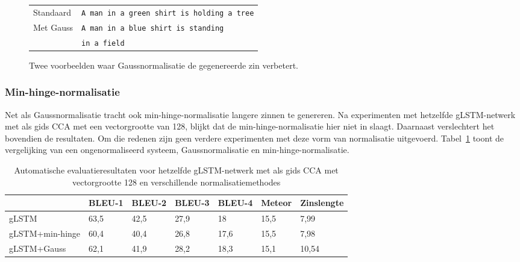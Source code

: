 \begin{figure}
\begin{minipage}[t]{.3\textwidth}
		\end{minipage}\hfill
		\begin{minipage}[t]{.7\textwidth}
			\vspace{0pt}
			\begin{tabular}{ll}
				Standaard & \texttt{A man in a green shirt is holding a tree} \\
				Met Gauss & \texttt{A man in a blue shirt is standing }\\
				~ & \texttt{in a field} \\
			\end{tabular}
		\end{minipage}
\caption{Twee voorbeelden waar Gaussnormalisatie de gegenereerde zin verbetert.}
\label{fig:gauss_improve}
\end{figure}
\subsubsection{Min-hinge-normalisatie}
Net als Gaussnormalisatie tracht ook min-hinge-normalisatie langere zinnen te genereren.
Na experimenten met hetzelfde gLSTM-netwerk met als gids CCA met een vectorgrootte van 128, blijkt dat de min-hinge-normalisatie hier niet in slaagt. Daarnaast verslechtert het bovendien de resultaten. Om die redenen zijn geen verdere experimenten met deze vorm van normalisatie uitgevoerd. Tabel~\ref{table:minhinge} toont de vergelijking van een ongenormaliseerd systeem, Gaussnormalisatie en min-hinge-normalisatie.

\begin{table}
	\centering
	\begin{tabular}{lllllll}
		~                  & BLEU-1 & BLEU-2 & BLEU-3 & BLEU-4 & Meteor&Zinslengte \\ \hline
		gLSTM        & 63,5   & 42,5 			& 27,9   & 18   & 15,5&7,99  \\
		gLSTM+min-hinge & 60,4   &40,4    &26,8   & 17,6   & 15,5& 7,98 \\
		gLSTM+Gauss   & 62,1   & 41,9   & 28,2   & 18,3 & 15,1& 10,54 \\ \hline
		
	\end{tabular}
	
	\caption{Automatische evaluatieresultaten voor hetzelfde gLSTM-netwerk met als gids CCA met vectorgrootte 128 en verschillende normalisatiemethodes}
	\label{table:minhinge}
\end{table}

